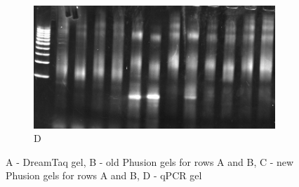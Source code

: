 \documentclass[parskip=full, numbers=noenddot]{scrreprt}
\begin{document}
\begin{figure}[htpb]
\begin{subfigure}[htpb]{0.4\textwidth}
    \centering
    \includegraphics[width=\textwidth]{qpcrgel}
    \caption{D}
    \label{fig:barcoding_d}
  \end{subfigure}
  \caption{A - DreamTaq gel, B - old Phusion gels for rows A and B, C - new Phusion gels for rows A and B, D - qPCR gel}
  \label{fig:barcoding}
\end{figure}
\end{document}
